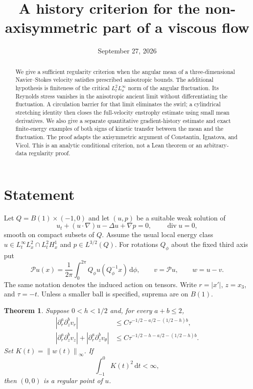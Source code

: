 \documentclass[11pt]{article}
\title{A history criterion for the non-axisymmetric part of a viscous flow}
\author{}
\date{September 27, 2026}
\newtheorem{theorem}{Theorem}
\theoremstyle{remark}
\newcommand{\PP}{\mathcal P}
\newcommand{\dd}{\,\mathrm d}
\newcommand{\norm}[1]{\left\lVert#1\right\rVert}
\newcommand{\diver}{\operatorname{div}}
\begin{document}
\maketitle
\begin{abstract}
We give a sufficient regularity criterion when the angular mean of a
three-dimensional Navier--Stokes velocity satisfies prescribed anisotropic
bounds. The additional hypothesis is finiteness of the critical
$L^2_tL^\infty_x$ norm of the angular fluctuation. Its Reynolds stress
vanishes in the anisotropic ancient limit without differentiating the
fluctuation. A circulation barrier for that limit eliminates the swirl;
a cylindrical stretching identity then closes the full-velocity enstrophy
estimate using small mean derivatives. We also give a separate quantitative
gradient-history estimate and exact finite-energy examples of both signs
of kinetic transfer between the mean and the fluctuation.
The proof adapts the axisymmetric argument of Constantin, Ignatova, and
Vicol. This is an analytic conditional criterion, not a Lean theorem or
an arbitrary-data regularity proof.
\end{abstract}

\section{Statement}

Let $Q=B(1)\times(-1,0)$ and let $(u,p)$ be a suitable weak solution of
\[
 u_t+(u\cdot\nabla)u-\Delta u+\nabla p=0,\qquad \diver u=0,
\]
smooth on compact subsets of $Q$. Assume the usual local energy class
$u\in L^\infty_tL^2_x\cap L^2_tH^1_x$ and $p\in L^{3/2}(Q)$.
For rotations $Q_\phi$ about the fixed third axis put
\[
 \PP u(x)=\frac1{2\pi}\int_0^{2\pi}Q_\phi u(Q_\phi^{-1}x)\dd\phi,
 \qquad v=\PP u,\qquad w=u-v.
\]
The same notation denotes the induced action on tensors. Write $r=|x'|$,
$z=x_3$, and $\tau=-t$. Unless a smaller ball is specified, suprema are on $B(1)$.

\begin{theorem}\label{thm:main}
Suppose $0<h<1/2$ and, for every $a+b\leq2$,
\begin{align}
 |\partial_r^a\partial_z^b v_r|
 &\leq C\tau^{-1/2-a/2-(1/2-h)b},\label{eq:meanr}\\
 |\partial_r^a\partial_z^b v_z|+|\partial_r^a\partial_z^b v_\theta|
 &\leq C\tau^{-1/2-h-a/2-(1/2-h)b}.\label{eq:meanz}
\end{align}
Set $K(t)=\norm{w(t)}_\infty$. If
\begin{equation}\label{eq:history}
 \int_{-1}^0 K(t)^2\dd t<\infty,
\end{equation}
then $(0,0)$ is a regular point of $u$.
\end{theorem}
\end{document}
